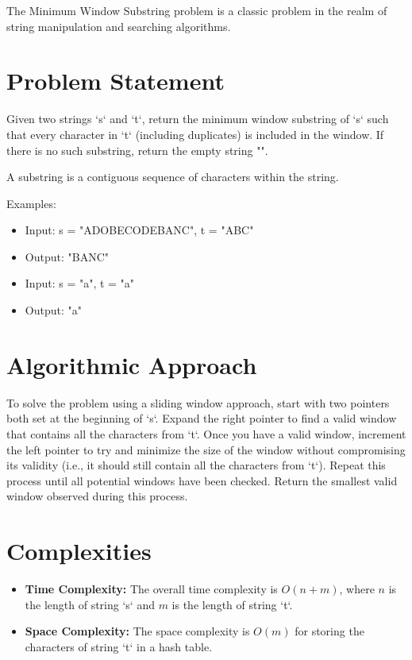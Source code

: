 \label{chap:Minimum_Window_Substring}
The Minimum Window Substring problem is a classic problem in the realm of string manipulation and searching algorithms.

\section*{Problem Statement}
Given two strings `s` and `t`, return the minimum window substring of `s` such that every character in `t` (including duplicates) is included in the window. If there is no such substring, return the empty string "".

A substring is a contiguous sequence of characters within the string.

Examples:
\begin{itemize}
	\item Input: s = "ADOBECODEBANC", t = "ABC"
	\item Output: "BANC"
\end{itemize}

\begin{itemize}
	\item Input: s = "a", t = "a"
	\item Output: "a"
\end{itemize}

\section*{Algorithmic Approach}
To solve the problem using a sliding window approach, start with two pointers both set at the beginning of `s`. Expand the right pointer to find a valid window that contains all the characters from `t`. Once you have a valid window, increment the left pointer to try and minimize the size of the window without compromising its validity (i.e., it should still contain all the characters from `t`). Repeat this process until all potential windows have been checked. Return the smallest valid window observed during this process.

\section*{Complexities}
\begin{itemize}
	\item \textbf{Time Complexity:} The overall time complexity is \(O(n + m)\), where \(n\) is the length of string `s` and \(m\) is the length of string `t`.
	\item \textbf{Space Complexity:} The space complexity is \(O(m)\) for storing the characters of string `t` in a hash table.
\end{itemize}

